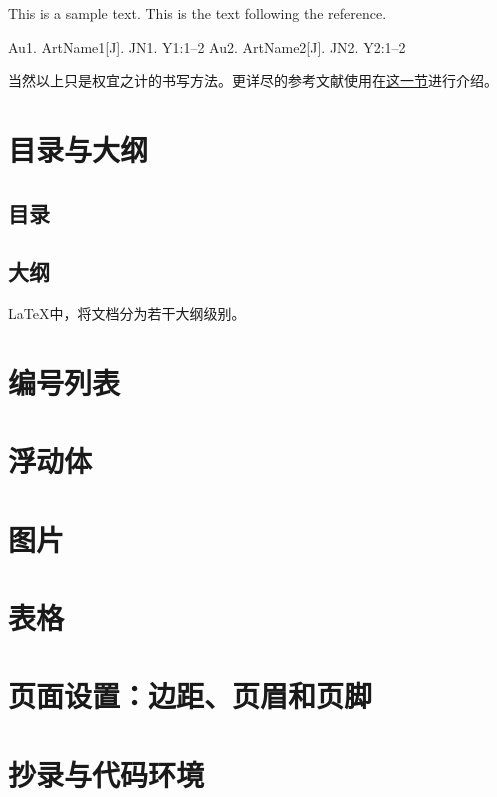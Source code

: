 {\begin{latex}{}
This is a sample text.\cite{author1.year1,author2.year2}
This is the text following the reference.
\begin{thebibliography}{99}
  \addtolength{\itemsep}{-2ex} %
  Au1. ArtName1[J]. JN1. Y1:1--2
  Au2. ArtName2[J]. JN2. Y2:1--2
\end{thebibliography}

\end{latex}

当然以上只是权宜之计的书写方法。更详尽的参考文献使用在\hyperref[sec:bibtex]{\bibtex{}这一节}进行介绍。

\section{目录与大纲}
\subsection{目录}

\subsection{大纲}
\LaTeX 中，将文档分为若干大纲级别。

\section{编号列表}


\section{浮动体}
\label{sec:float}

\section{图片}

\section{表格}

\section{页面设置：边距、页眉和页脚}

\section{抄录与代码环境}

}
